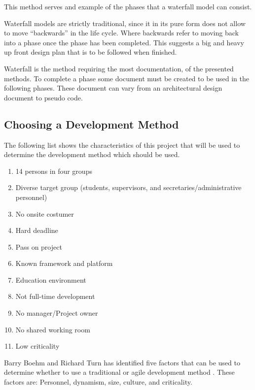 This method serves and example of the phases that a waterfall model can consist.

Waterfall models are strictly traditional, since it in its pure form does not allow to move ``backwards'' in the life cycle.
Where backwards refer to moving back into a phase once the phase has been completed.
This suggests a big and heavy up front design plan that is to be followed when finished.

Waterfall is the method requiring the most documentation, of the presented methods.
To complete a phase some document must be created to be used in the following phases.
These document can vary from an architectural design document to pseudo code.

\subsection{Choosing a Development Method}
The following list shows the characteristics of this project that will be used to determine the development method which should be used. 
\begin{enumerate}
	\item 14 persons in four groups \label{enum:groupSize}
	\item Diverse target group (students, supervisors, and secretaries/administrative personnel) \label{enum:targetGroup}
	\item No onsite costumer \label{enum:onsite}
	\item Hard deadline \label{enum:deadline}
	\item Pass on project \label{enum:passed}
	\item Known framework and platform \label{enum:framework}
	\item Education environment \label{enum:education}
	\item Not full-time development \label{enum:halftime}
	\item No manager/Project owner \label{enum:manager}
	\item No shared working room \label{enum:room}
	\item Low criticality \label{enum:criticality}
\end{enumerate}
Barry Boehm and Richard Turn has identified five factors that can be used to determine whether to use a traditional or agile development method \citep{boehmTurner}.
These factors are: Personnel, dynamism, size, culture, and criticality.

